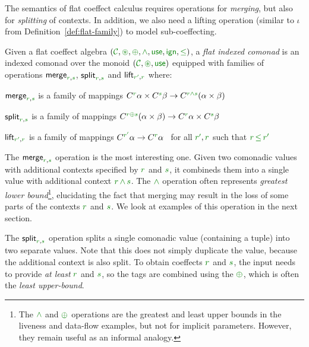 The semantics of flat coeffect calculus requires operations for \emph{merging}, but also for
\emph{splitting} of contexts. In addition, we also need a lifting operation (similar to $\iota$ 
from Definition~\ref{def:flat-family}) to model sub-coeffecting.

\begin{definition}
Given a flat coeffect algebra $(\C, \cseq, \cpar, \czip, \cunit, \czero, \cleq)$,
a \emph{flat indexed comonad} is an indexed comonad over the monoid $(\C, \cseq, \cunit)$
equipped with families of operations $\ident{merge}_{\cclrd{r},\cclrd{s}}$, $\ident{split}_{\cclrd{r},\cclrd{s}}$ 
and $\ident{lift}_{\cclrd{r'},\cclrd{r}}$ where:
%
\begin{compactitem}
\item $\ident{merge}_{\cclrd{r},\cclrd{s}}$ is a family of mappings
  $\ctyp{\cclrd{r}}{\alpha} \times \ctyp{\cclrd{s}}{\beta} \rightarrow \ctyp{\cclrd{r}\czip\cclrd{s}}{(\alpha \times \beta)}$
\item $\ident{split}_{\cclrd{r},\cclrd{s}}$ is a family of mappings
  $\ctyp{\cclrd{r}\cpar\cclrd{s}}{(\alpha \times \beta)} \rightarrow \ctyp{\cclrd{r}}{\alpha} \times \ctyp{\cclrd{s}}{\beta}$
\item $\ident{lift}_{\cclrd{r'},\cclrd{r}}$ is a family of mappings
  $\ctyp{\cclrd{r'}}{\alpha} \rightarrow \ctyp{\cclrd{r}}{\alpha}$~ for all $\cclrd{r'}, \cclrd{r}$ such that $\cclrd{r}\,\cleq\,\cclrd{r'}$
\end{compactitem}
\end{definition}

\noindent
The $\ident{merge}_{\cclrd{r},\cclrd{s}}$ operation is the most interesting one. Given two comonadic
values with additional contexts specified by $\cclrd{r}$ and $\cclrd{s}$, it combineds them into a 
single value with additional context $\cclrd{r}\,\czip\,\cclrd{s}$. The $\czip$ operation often represents
\emph{greatest lower bound}\footnote{The $\czip$ and $\cpar$ operations are the greatest and least upper 
bounds in the liveness and data-flow examples, but not for implicit parameters. However, they remain useful 
as an informal analogy.}, elucidating the fact that merging may result in the loss of some parts of 
the contexts $\cclrd{r}$ and $\cclrd{s}$. We look at examples of this operation in the next section.

The $\ident{split}_{\cclrd{r},\cclrd{s}}$ operation splits a single comonadic value (containing a tuple)
into two separate values. Note that this does not simply duplicate the value, because the additional
context is also split. To obtain coeffects $\cclrd{r}$ and $\cclrd{s}$, the input needs to provide 
\emph{at least} $\cclrd{r}$ and $\cclrd{s}$, so the tags are combined using the $\cpar$, which is often 
the \emph{least upper-bound}\footnotemark[1].

